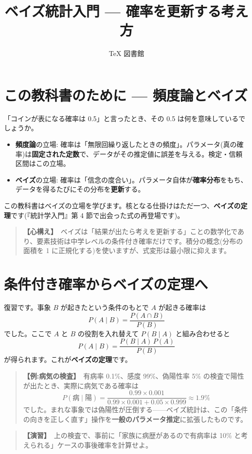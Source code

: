 \documentclass{article}
\title{ベイズ統計入門 — 確率を更新する考え方}
\author{TeX 図書館}
\begin{document}
\section{この教科書のために — 頻度論とベイズ}

「コインが表になる確率は 0.5」と言ったとき、その 0.5 は何を意味しているでしょうか。

\begin{itemize}
\item \textbf{頻度論}の立場: 確率は「無限回繰り返したときの頻度」。パラメータ(真の確率)は\textbf{固定された定数}で、データがその推定値に誤差を与える。検定・信頼区間はこの立場。
\item \textbf{ベイズ}の立場: 確率は「信念の度合い」。パラメータ自体が\textbf{確率分布}をもち、データを得るたびにその分布を\textbf{更新}する。
\end{itemize}

この教科書はベイズの立場を学びます。核となる仕掛けはただ一つ、\textbf{ベイズの定理}です(『統計学入門』第 4 節で出会った式の再登場です)。

\begin{quote}
\textbf{【心構え】}\ ベイズは「結果が出たら考えを更新する」ことの数学化であり、要素技術は中学レベルの条件付き確率だけです。積分の概念(分布の面積を 1 に正規化する)を使いますが、式変形は最小限に抑えます。
\end{quote}

\section{条件付き確率からベイズの定理へ}

復習です。事象 \(B\) が起きたという条件のもとで \(A\) が起きる確率は
\[ P(A \mid B) = \frac{P(A \cap B)}{P(B)} \]
でした。ここで \(A\) と \(B\) の役割を入れ替えて \(P(B \mid A)\) と組み合わせると
\[ P(A \mid B) = \frac{P(B \mid A)\, P(A)}{P(B)} \]
が得られます。これが\textbf{ベイズの定理}です。

\begin{quote}
\textbf{【例:病気の検査】}\ 有病率 0.1\%、感度 99\%、偽陽性率 5\% の検査で陽性が出たとき、実際に病気である確率は
\[ P(\text{病} \mid \text{陽}) = \frac{0.99 \times 0.001}{0.99 \times 0.001 + 0.05 \times 0.999} \approx 1.9\% \]
でした。まれな事象では偽陽性が圧倒する——ベイズ統計は、この「条件の向きを正しく直す」操作を\textbf{一般のパラメータ推定}に拡張したものです。
\end{quote}

\begin{quote}
\textbf{【演習】}\ 上の検査で、事前に「家族に病歴があるので有病率は 10\% と考えられる」ケースの事後確率を計算せよ。
\end{quote}
\end{document}
